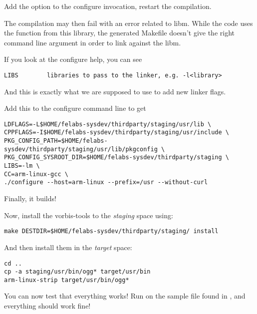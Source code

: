 Add the  option to the configure invocation,
restart the compilation.

The compilation may then fail with an error related to libm. While
the code uses the function from this library, the generated Makefile
doesn't give the right command line argument in order to link against
the libm.

If you look at the configure help, you can see
\begin{verbatim}
LIBS        libraries to pass to the linker, e.g. -l<library>
\end{verbatim}

And this is exactly what we are supposed to use to add new linker
flags.

Add this to the configure command line to get
\begin{verbatim}
LDFLAGS=-L$HOME/felabs-sysdev/thirdparty/staging/usr/lib \
CPPFLAGS=-I$HOME/felabs-sysdev/thirdparty/staging/usr/include \
PKG_CONFIG_PATH=$HOME/felabs-sysdev/thirdparty/staging/usr/lib/pkgconfig \
PKG_CONFIG_SYSROOT_DIR=$HOME/felabs-sysdev/thirdparty/staging \
LIBS=-lm \
CC=arm-linux-gcc \
./configure --host=arm-linux --prefix=/usr --without-curl
\end{verbatim}

Finally, it builds!

Now, install the vorbis-tools to the {\em staging} space using:

\begin{verbatim}
make DESTDIR=$HOME/felabs-sysdev/thirdparty/staging/ install
\end{verbatim}

And then install them in the {\em target} space:

\begin{verbatim}
cd ..
cp -a staging/usr/bin/ogg* target/usr/bin
arm-linux-strip target/usr/bin/ogg*
\end{verbatim}

You can now test that everything works! Run  on the
sample file found in , and everything should
work fine!
